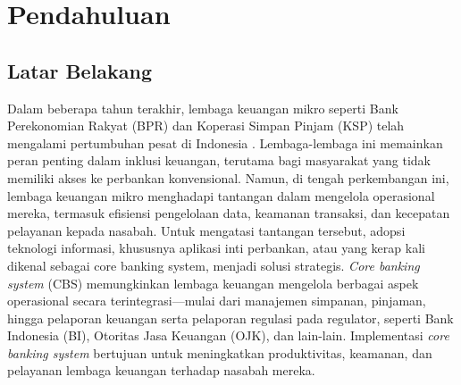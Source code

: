 \documentclass[journal,article,submit,pdftex,moreauthors]{Definitions/mdpi}
\begin{document}



\section{Pendahuluan}

\subsection{Latar Belakang}

Dalam beberapa tahun terakhir, lembaga keuangan mikro seperti Bank Perekonomian Rakyat (BPR) dan Koperasi Simpan Pinjam (KSP) telah mengalami pertumbuhan pesat di Indonesia \cite{OJK2024roadmap}. Lembaga-lembaga ini memainkan peran penting dalam inklusi keuangan, terutama bagi masyarakat yang tidak memiliki akses ke perbankan konvensional. Namun, di tengah perkembangan ini, lembaga keuangan mikro menghadapi tantangan dalam mengelola operasional mereka, termasuk efisiensi pengelolaan data, keamanan transaksi, dan kecepatan pelayanan kepada nasabah. Untuk mengatasi tantangan tersebut, adopsi teknologi informasi, khususnya aplikasi inti perbankan, atau yang kerap kali dikenal sebagai core banking system, menjadi solusi strategis. \textit{Core banking system} (CBS) memungkinkan lembaga keuangan mengelola berbagai aspek operasional secara terintegrasi—mulai dari manajemen simpanan, pinjaman, hingga pelaporan keuangan serta pelaporan regulasi pada regulator, seperti Bank Indonesia (BI), Otoritas Jasa Keuangan (OJK), dan lain-lain. Implementasi \textit{core banking system} bertujuan untuk meningkatkan produktivitas, keamanan, dan pelayanan lembaga keuangan terhadap nasabah mereka.
\end{document}
